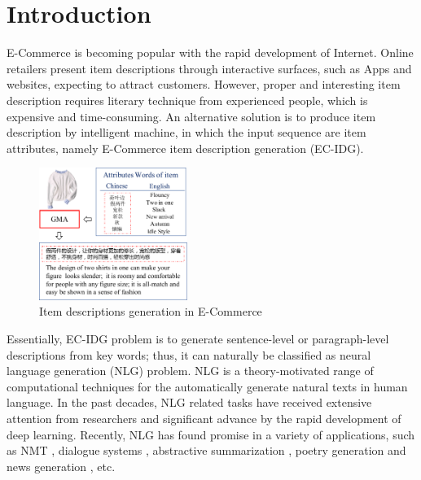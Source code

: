 \documentclass[letterpaper]{article} %
\begin{document}
\section{Introduction}

E-Commerce is becoming popular with the rapid development of Internet.
Online retailers present item descriptions through interactive surfaces, such as Apps and websites, expecting to attract customers.
However, proper and interesting item description requires literary technique from experienced people, which is expensive and time-consuming.
An alternative solution is to produce item description by intelligent machine, in which the input sequence are item attributes, namely E-Commerce item description generation (EC-IDG).

\begin{figure}[t]
\centering
\includegraphics[width=0.43\textwidth]{intro.pdf}
\caption{Item descriptions generation in E-Commerce}
\label{Fig:intro}
\end{figure}


Essentially, EC-IDG problem is to generate sentence-level or paragraph-level descriptions from key words; thus, it can naturally be classified as neural language generation (NLG) problem.
NLG is a theory-motivated range of computational techniques for the automatically generate natural texts in human language.
In the past decades, NLG related tasks have received extensive attention from researchers and significant advance by the rapid development of deep learning.
Recently, NLG has found promise in a variety of applications, such as NMT \cite{bahdanau2014neural}, dialogue systems \cite{lowe2015ubuntu,serban2016building,li2016deep}, abstractive summarization \cite{rush2015neural,paulus2017deep}, poetry generation \cite{zhang2014chinese} and news generation \cite{zhang2016towards}, etc.
\end{document}
